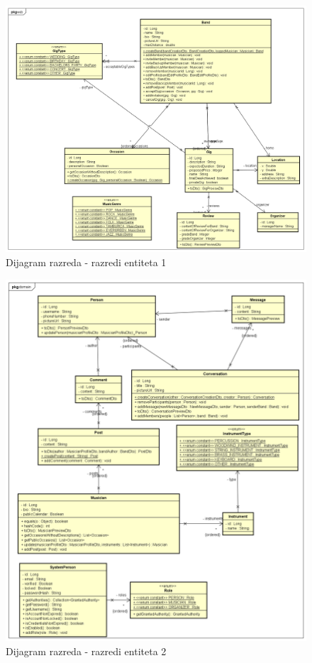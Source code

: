 	
		\begin{figure}[H]
			\begin{center}
				\includegraphics[width=17cm]{slike/entiteti_1.PNG}
			\end{center}
			\caption{Dijagram razreda - razredi entiteta 1}
			\label{fig:domena}
		\end{figure}
	
		\begin{figure}[H]
		\begin{center}
			\includegraphics[width=17cm]{slike/entiteti_2.PNG}
		\end{center}
		\caption{Dijagram razreda - razredi entiteta 2}
		\label{fig:domena2}
	\end{figure}
	
